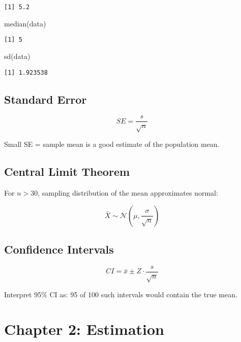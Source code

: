 \documentclass[
  letterpaper,
  DIV=11,
  numbers=noendperiod]{scrreprt}
\newenvironment{Shaded}{\begin{snugshade}}{\end{snugshade}}
\newcommand{\FunctionTok}[1]{\textcolor[rgb]{0.28,0.35,0.67}{#1}}
\newcommand{\NormalTok}[1]{\textcolor[rgb]{0.00,0.23,0.31}{#1}}
\begin{document}
\begin{verbatim}
[1] 5.2
\end{verbatim}

\begin{Shaded}
\begin{Highlighting}[]
\FunctionTok{median}\NormalTok{(data)}
\end{Highlighting}
\end{Shaded}

\begin{verbatim}
[1] 5
\end{verbatim}

\begin{Shaded}
\begin{Highlighting}[]
\FunctionTok{sd}\NormalTok{(data)}
\end{Highlighting}
\end{Shaded}

\begin{verbatim}
[1] 1.923538
\end{verbatim}

\subsection{Standard Error}\label{standard-error}

\[
SE = \frac{s}{\sqrt{n}}
\]

Small SE = sample mean is a good estimate of the population mean.

\subsection{Central Limit Theorem}\label{central-limit-theorem}

For \(n > 30\), sampling distribution of the mean approximates normal:

\[
\bar{X} \sim \mathcal{N}(\mu, \frac{\sigma}{\sqrt{n}})
\]

\subsection{Confidence Intervals}\label{confidence-intervals}

\[
CI = \bar{x} \pm Z \cdot \frac{s}{\sqrt{n}}
\]

Interpret 95\% CI as: 95 of 100 such intervals would contain the true
mean.

\section{Chapter 2: Estimation}\label{chapter-2-estimation}
\end{document}
